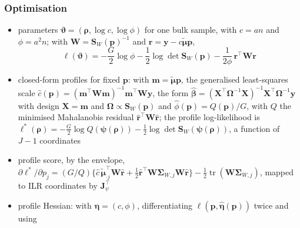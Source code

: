 \subsubsection{Optimisation}
\label{sec:sc-newton}

\begin{itemize}
  \item parameters \(\boldsymbol{\vartheta}=(\boldsymbol{\rho},\log c,\log\phi)\) for one bulk sample, with
        \(c=an\) and \(\phi=a^{2}n\); with \(\boldsymbol{W}=\boldsymbol{S}_{W}(\boldsymbol{p})^{-1}\) and
        \(\boldsymbol{r}=\boldsymbol{y}-c\tilde{\boldsymbol{\mu}}\boldsymbol{p}\),
        \begin{equation}
          \ell(\boldsymbol{\vartheta})
          =-\frac{G}{2}\log\phi-\frac12\log\det\boldsymbol{S}_{W}(\boldsymbol{p})
          -\frac{1}{2\phi}\,\boldsymbol{r}^{\top}\boldsymbol{W}\boldsymbol{r}
          \label{eq:sc-loglik}
        \end{equation}
  \item closed-form profiles for fixed \(\boldsymbol{p}\): with \(\boldsymbol{m}=\tilde{\boldsymbol{\mu}}\boldsymbol{p}\), the generalised least-squares scale
        \(\hat c(\boldsymbol{p})=(\boldsymbol{m}^{\top}\boldsymbol{W}\boldsymbol{m})^{-1}\boldsymbol{m}^{\top}\boldsymbol{W}\boldsymbol{y}\), the form
        \(\hat{\boldsymbol{\beta}}=(\boldsymbol{X}^{\top}\boldsymbol{\Omega}^{-1}\boldsymbol{X})^{-1}\boldsymbol{X}^{\top}\boldsymbol{\Omega}^{-1}\boldsymbol{y}\) with design \(\boldsymbol{X}=\boldsymbol{m}\)
        and \(\boldsymbol{\Omega}\propto\boldsymbol{S}_{W}(\boldsymbol{p})\)
        and \(\hat\phi(\boldsymbol{p})=Q(\boldsymbol{p})/G\), with \(Q\) the minimised Mahalanobis residual
        \(\hat{\boldsymbol{r}}^{\top}\boldsymbol{W}\hat{\boldsymbol{r}}\); the profile log-likelihood is
        \(\ell^{\ast}(\boldsymbol{\rho})=-\tfrac{G}{2}\log Q(\boldsymbol{\psi}(\boldsymbol{\rho}))-\tfrac12\log\det\boldsymbol{S}_{W}(\boldsymbol{\psi}(\boldsymbol{\rho}))\),
        a function of \(J-1\) coordinates
  \item profile score, by the \gls{envelope},
        \(\partial\ell^{\ast}/\partial p_{j}=(G/Q)\{\hat c\,\tilde{\boldsymbol{\mu}}_{\cdot j}^{\top}\boldsymbol{W}\hat{\boldsymbol{r}}
        +\tfrac12\hat{\boldsymbol{r}}^{\top}\boldsymbol{W}\boldsymbol{\Sigma}_{W,j}\boldsymbol{W}\hat{\boldsymbol{r}}\}
        -\tfrac12\operatorname{tr}(\boldsymbol{W}\boldsymbol{\Sigma}_{W,j})\), mapped to ILR coordinates by
        \(\mathbf{J}_{\psi}^{\top}\)
  \item profile Hessian: with \(\boldsymbol{\eta}=(c,\phi)\), differentiating \(\ell(\boldsymbol{p},\hat{\boldsymbol{\eta}}(\boldsymbol{p}))\) twice and using

\end{itemize}
